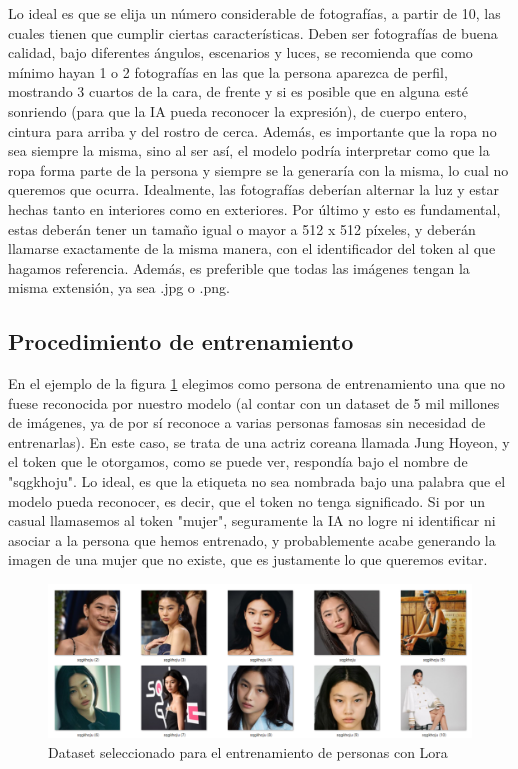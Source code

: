 Lo ideal es que se elija un número considerable de fotografías, a partir de 10, las cuales tienen que cumplir ciertas características. Deben ser fotografías de buena calidad, bajo diferentes ángulos, escenarios y luces, se recomienda que como mínimo hayan 1 o 2 fotografías en las que la persona aparezca de perfil, mostrando 3 cuartos de la cara, de frente y si es posible que en alguna esté sonriendo (para que la IA pueda reconocer la expresión), de cuerpo entero, cintura para arriba y del rostro de cerca. Además, es importante que la ropa no sea siempre la misma, sino al ser así, el modelo podría interpretar como que la ropa forma parte de la persona y siempre se la generaría con la misma, lo cual no queremos que ocurra. Idealmente, las fotografías deberían alternar la luz y estar hechas tanto en interiores como en exteriores. Por último y esto es fundamental, estas deberán tener un tamaño igual o mayor a 512 x 512 píxeles, y deberán llamarse exactamente de la misma manera, con el identificador del token al que hagamos referencia. Además, es preferible que todas las imágenes tengan la misma extensión, ya sea .jpg o .png. 

\subsection{Procedimiento de entrenamiento}

En el ejemplo de la figura \ref{fig:datasethoyeon}  elegimos como persona de entrenamiento una que no fuese reconocida por nuestro modelo (al contar con un dataset de 5 mil millones de imágenes, ya de por sí reconoce a varias personas famosas sin necesidad de entrenarlas). En este caso, se trata de una actriz coreana llamada Jung Hoyeon, y el token que le otorgamos, como se puede ver, respondía bajo el nombre de "sqgkhoju". Lo ideal, es que la etiqueta no sea nombrada bajo una palabra que el modelo pueda reconocer, es decir, que el token no tenga significado. Si por un casual llamasemos al token "mujer", seguramente la IA no logre ni identificar ni asociar a la persona que hemos entrenado, y probablemente acabe generando la imagen de una mujer que no existe, que es justamente lo que queremos evitar. \\

\begin{figure}[h]
	\centering
	\includegraphics[width = 1
	\textwidth]{Imagenes/Vectorial/datasethoyeon.png}
	\caption{Dataset seleccionado para el entrenamiento de personas con Lora}
	\label{fig:datasethoyeon}
\end{figure}

